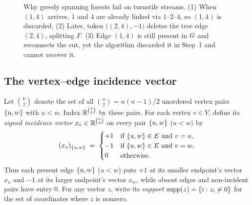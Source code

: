 \begin{figure}[htbp]
\caption{Why greedy spanning forests fail on turnstile streams. (1) When $(1,4)$ arrives, $1$ and $4$ are already linked via $1$--$2$--$4$, so $(1,4)$ is discarded. (2) Later, token $\bigl((2,4),-1\bigr)$ deletes the tree edge $(2,4)$, splitting $F$. (3) Edge $(1,4)$ is still present in $G$ and reconnects the cut, yet the algorithm discarded it in Step~1 and cannot recover it.}
\label{ch40:fig-greedy-delete}
\end{figure}

\subsection{The vertex--edge incidence vector}

Let $\binom{V}{2}$ denote the set of all $\binom{n}{2}=n(n-1)/2$ unordered
vertex pairs $\{u,w\}$ with $u < w$. Index $\mathbb{R}^{\binom{n}{2}}$ by these
pairs. For each vertex $v \in V$, define its \emph{signed incidence vector}
$x_v \in \mathbb{R}^{\binom{n}{2}}$ on every pair $\{u,w\}$ ($u < w$) by
\[
  (x_v)_{\{u,w\}} \;=\;
  \begin{cases}
    +1 & \text{if } \{u,w\}\in E \text{ and } v = u,\\
    -1 & \text{if } \{u,w\}\in E \text{ and } v = w,\\
    0  & \text{otherwise.}
  \end{cases}
\]
Thus each present edge $\{u,w\}$ ($u<w$) puts $+1$ at its smaller endpoint's
vector $x_u$ and $-1$ at its larger endpoint's vector $x_w$, while absent edges
and non-incident pairs have entry $0$. For any vector $z$, write its
\emph{support} $\operatorname{supp}(z) = \{i : z_i \neq 0\}$ for the set of
coordinates where $z$ is nonzero.

